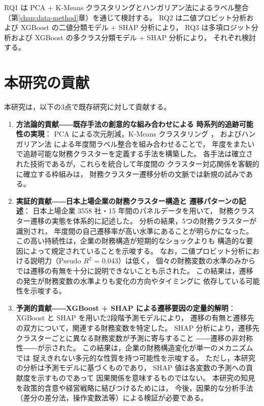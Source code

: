 RQ1 は PCA + K-Means クラスタリングとハンガリアン法によるラベル整合
（第\ref{chap:data-method}章）を通じて検討する。
RQ2 は二値プロビット分析および XGBoost の二値分類モデル + SHAP 分析により，
RQ3 は多項ロジット分析および XGBoost の多クラス分類モデル + SHAP 分析により，
それぞれ検討する。

\section{本研究の貢献}
\label{sec:intro-contribution}

本研究は，以下の3点で既存研究に対して貢献する。

\begin{enumerate}
  \item \textbf{方法論的貢献――既存手法の創意的な組み合わせによる
    時系列的追跡可能性の実現}：
    PCA による次元削減，K-Means クラスタリング \citep{Lloyd1982}，
    およびハンガリアン法 \citep{Kuhn1955} による年度間ラベル整合を組み合わせることで，
    年度をまたいで追跡可能な財務クラスターを定義する手法を構築した。
    各手法は確立された技術であるが，これらを統合して年度間の
    クラスター対応関係を客観的に確立する枠組みは，
    財務クラスター遷移分析の文脈では新規の試みである。

  \item \textbf{実証的貢献――日本上場企業の財務クラスター構造と
    遷移パターンの記述}：
    日本上場企業 \num{3558} 社・15 年間のパネルデータを用いて，
    財務クラスター遷移の実態を体系的に記述した。
    分析の結果，5つの財務クラスターが識別され，
    年度間の自己遷移率が高い水準にあることが明らかになった。
    この高い持続性は，企業の財務構造が短期的なショックよりも
    構造的な要因によって規定されていることを示唆する。
    なお，二値プロビット分析における説明力（Pseudo $R^2$ = 0.043）は低く，
    個々の財務変数の水準のみからでは遷移の有無を十分に説明できないことも示された。
    この結果は，遷移の発生が財務変数の水準よりも変化の方向やタイミングに
    依存している可能性を示唆する。

  \item \textbf{予測的貢献――XGBoost + SHAP による遷移要因の定量的解明}：
    XGBoost と SHAP を用いた2段階予測モデルにより，
    遷移の有無と遷移先の双方について，関連する財務変数を特定した。
    SHAP 分析により，遷移先クラスターごとに異なる財務変数が予測に寄与すること
    ――遷移の非対称性――が示された。
    この結果は，企業の財務構造変化が単一のメカニズムでは
    捉えきれない多元的な性質を持つ可能性を示唆する。
    ただし，本研究の分析は予測モデルに基づくものであり，
    SHAP 値は各変数の予測への貢献度を示すものであって
    因果関係を意味するものではない。
    本研究の知見を政策的含意や経営戦略に結びつけるためには，
    今後，因果的な分析手法（差分の差分法，操作変数法等）による検証が必要である。
\end{enumerate}

